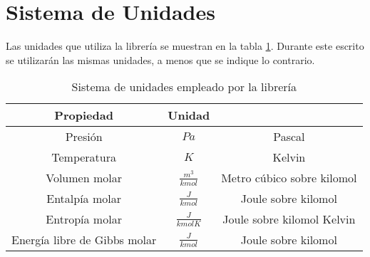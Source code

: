 \section{Sistema de Unidades}\label{sec:units}

Las unidades que utiliza la librería se muestran en la tabla \ref{tab:units}.
Durante este escrito se utilizarán las mismas unidades, a menos que se indique lo contrario.


\begin{table}[!h]
	\centering
	\caption{Sistema de unidades empleado por la librería}\label{tab:units}
	\begin{tabular}{ |c| c|c|}
		\hline
			Propiedad & Unidad &\\
		\hline
			Presión & $Pa$ & Pascal\\
			Temperatura & $K$ & Kelvin\\
			Volumen molar & $\frac{m^3}{kmol}$ & Metro cúbico sobre kilomol\\
			Entalpía molar & $\frac{J}{kmol}$ & Joule sobre kilomol\\
			Entropía molar & $\frac{J}{kmol K}$ & Joule sobre kilomol Kelvin\\
			Energía libre de Gibbs molar & $\frac{J}{kmol}$ & Joule sobre kilomol\\

		\hline
	\end{tabular}
\end{table}